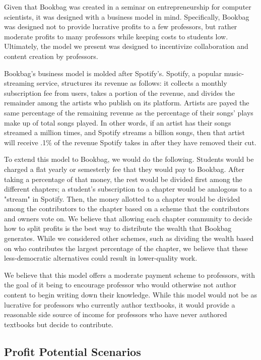 \documentclass[pageno]{jpaper}
\begin{document}
Given that Bookbag was created in a seminar on entrepreneurship for computer scientists, it was designed with a business model in mind. Specifically, Bookbag was designed not to provide lucrative profits to a few professors, but rather moderate profits to many professors while keeping costs to students low. Ultimately, the model we present was designed to incentivize collaboration and content creation by professors.

Bookbag's business model is molded after Spotify's. Spotify, a popular music-streaming service, structures its revenue as follows: it collects a monthly subscription fee from users, takes a portion of the revenue, and divides the remainder among the artists who publish on its platform. Artists are payed the same percentage of the remaining revenue as the percentage of their songs' plays make up of total songs played. In other words, if an artist has their songs streamed a million times, and Spotify streams a billion songs, then that artist will receive .1\% of the revenue Spotify takes in after they have removed their cut.

To extend this model to Bookbag, we would do the following. Students would be charged a flat yearly or semesterly fee that they would pay to Bookbag. After taking a percentage of that money, the rest would be divided first among the different chapters; a student's subscription to a chapter would be analogous to a "stream" in Spotify. Then, the money allotted to a chapter would be divided among the contributors to the chapter based on a scheme that the contributors and owners vote on. We believe that allowing each chapter community to decide how to split profits is the best way to distribute the wealth that Bookbag generates. While we considered other schemes, such as dividing the wealth based on who contributes the largest percentage of the chapter, we believe that these less-democratic alternatives could result in lower-quality work.

We believe that this model offers a moderate payment scheme to professors, with the goal of it being to encourage professor who would otherwise not author content to begin writing down their knowledge. While this model would not be as lucrative for professors who currently author textbooks, it would provide a reasonable side source of income for professors who have never authored textbooks but decide to contribute.

\subsection{Profit Potential Scenarios}
\end{document}
